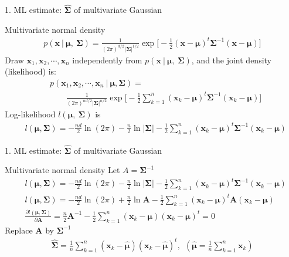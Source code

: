 \documentclass[compress,blue]{beamer}
\newcommand{\bx}{\mathbf{x}}
\newcommand{\bmu}{\mathbf{\mu}}
\newcommand{\bSig}{\mathbf{\Sigma}}
\begin{document}
\begin{frame}{1. ML estimate: $\hat{\bSig}$ of multivariate Gaussian }
	\begin{block}{Multivariate normal density}
		\begin{align}
			p(\bx ~|~ \bmu,~ \bSig) = \frac{1}{(2\pi)^{d/2}|\bSig|^{1/2}} \exp\Big[-\frac{1}{2}(\bx-\bmu)^t\bSig^{-1}(\bx-\bmu)\Big]
		\end{align}
		\small
		Draw $\bx_1, \bx_2, \cdots, \bx_n$ independently from $p(\bx~|~\bmu,~\bSig)$, and the joint density (likelihood) is: 
		\begin{align}
			&p(\bx_1, \bx_2, \cdots, \bx_n~|~\bmu,\bSig) = \\
			&\qquad\frac{1}{(2\pi)^{nd/2}|\bSig|^{n/2}} \exp\Big[-\frac{1}{2}\sum_{k=1}^{n}(\bx_k-\bmu)^t\bSig^{-1}(\bx_k-\bmu)\Big]
		\end{align}
		Log-likelihood $l(\bmu, ~\bSig)$ is 
		\begin{align}
			&l(\bmu,\bSig) = -\frac{nd}{2}\ln(2\pi)-\frac{n}{2}\ln|\bSig| -\frac{1}{2}\sum_{k=1}^{n}(\bx_k-\bmu)^t\bSig^{-1}(\bx_k-\bmu)
		\end{align}
		\normalsize
	\end{block}
\end{frame}

\begin{frame}{1. ML estimate: $\hat{\bSig}$ of multivariate Gaussian }
	\begin{block}{Multivariate normal density}
		\small
		Let $A = \bSig^{-1}$
		\begin{align}
			&l(\bmu,\bSig) = -\frac{nd}{2}\ln(2\pi)-\frac{n}{2}\ln|\bSig| -\frac{1}{2}\sum_{k=1}^{n}(\bx_k-\bmu)^t\bSig^{-1}(\bx_k-\bmu) \\ 
			&l(\bmu,\bSig) = -\frac{nd}{2}\ln(2\pi)+\frac{n}{2}\ln \mathbf{A} -\frac{1}{2}\sum_{k=1}^{n}(\bx_k-\bmu)^t \mathbf{A}(\bx_k-\bmu)\\
			& \frac{\partial l(\bmu,\bSig)}{\partial \mathbf{A} } = \frac{n}{2} \mathbf{A}^{-1} - \frac{1}{2} \sum_{k=1}^{n} (\bx_k-\bmu)(\bx_k-\bmu)^t = 0
		\end{align}
		Replace $\mathbf{A}$ by $\bSig^{-1}$ 
		\begin{align}
			\hat{\bSig} = \frac{1}{n} \sum_{k=1}^n (\bx_k-\hat{\bmu})(\bx_k-\hat{\bmu})^t, ~~ (\hat{\bmu} = \frac{1}{n}\sum_{k=1}^n \bx_k)
		\end{align}
		\normalsize
	\end{block}
\end{frame}
\end{document}
